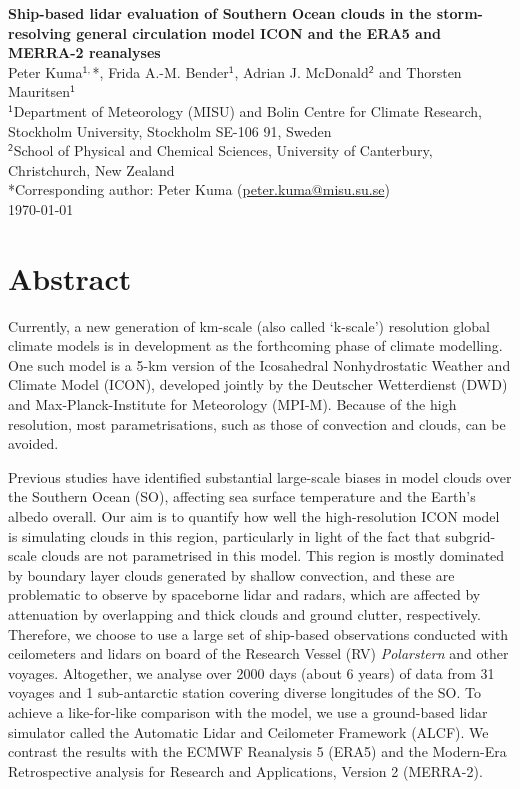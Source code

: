 \documentclass[12pt,a4paper]{article}
\begin{document}
\fontsize{13pt}{15pt}\selectfont

\begin{center} \Large \sffamily\textbf{Ship-based lidar evaluation of Southern Ocean clouds in the storm-resolving general circulation model ICON and the ERA5 and MERRA-2 reanalyses}\\[0.4cm]
\large Peter Kuma$^\mathsf{1,}$*, Frida A.-M. Bender$^\mathsf{1}$, Adrian J. McDonald$^\mathsf{2}$ and Thorsten Mauritsen$^\mathsf{1}$\\[0.4cm]
\small
$^\mathsf{1}$Department of Meteorology (MISU) and Bolin Centre for Climate Research, Stockholm University, Stockholm SE-106 91, Sweden\\[0.2cm]
$^\mathsf{2}$School of Physical and Chemical Sciences, University of Canterbury, Christchurch, New Zealand\\[0.2cm]
*Corresponding author: Peter Kuma (\href{mailto:peter.kuma@misu.su.se}{peter.kuma@misu.su.se})\\[0.4cm]
\large \today\\[0.4cm]

\end{center}

\section*{Abstract}

Currently, a new generation of km-scale (also called `k-scale') resolution
global climate models is in development as the forthcoming phase of climate
modelling. One such model is a 5-km version of the Icosahedral Nonhydrostatic
Weather and Climate Model (ICON), developed jointly by the Deutscher
Wetterdienst (DWD) and Max-Planck-Institute for Meteorology (MPI-M). Because of
the high resolution, most parametrisations, such as those of convection and
clouds, can be avoided.

Previous studies have identified substantial large-scale biases in model clouds
over the Southern Ocean (SO), affecting sea surface temperature and the Earth's
albedo overall. Our aim is to quantify how well the high-resolution ICON model
is simulating clouds in this region, particularly in light of the fact that
subgrid-scale clouds are not parametrised in this model. This region is mostly
dominated by boundary layer clouds generated by shallow convection, and
these are problematic to observe by spaceborne lidar and radars, which are
affected by attenuation by overlapping and thick clouds and ground clutter,
respectively. Therefore, we choose to use a large set of ship-based
observations conducted with ceilometers and lidars on board of the Research
Vessel (RV) \textit{Polarstern} and other voyages. Altogether, we analyse over
2000 days (about 6 years) of data from 31 voyages and 1 sub-antarctic station
covering diverse longitudes of the SO. To achieve a like-for-like comparison
with the model, we use a ground-based lidar simulator called the Automatic
Lidar and Ceilometer Framework (ALCF). We contrast the results with the ECMWF
Reanalysis 5 (ERA5) and the Modern-Era Retrospective analysis for Research and
Applications, Version 2 (MERRA-2).
\end{document}
